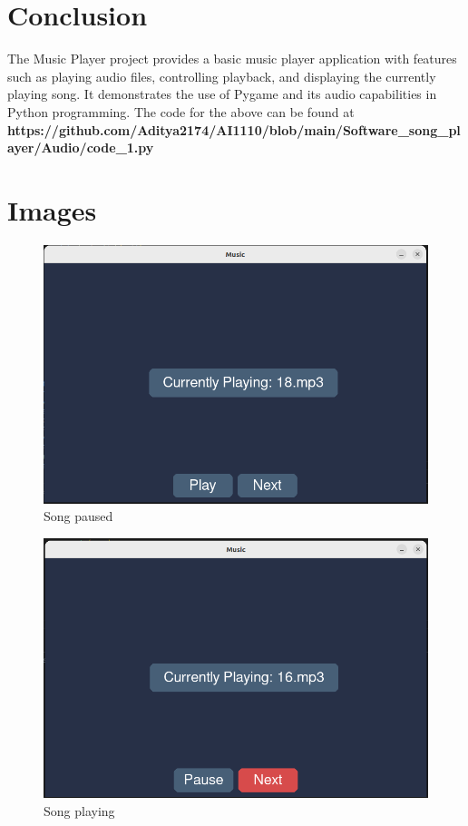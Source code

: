 \documentclass[journal,12pt,twocolumn]{IEEEtran}
\begin{document}
\section{Conclusion}
The Music Player project provides a basic music player application with features such as playing audio files, controlling playback, and displaying the currently playing song. It demonstrates the use of Pygame and its audio capabilities in Python programming.
The code for the above can be found at \textbf{https://github.com/Aditya2174/AI1110/blob/main/Software_song_player/Audio/code_1.py}


\section{Images}
    \begin{figure}[h]
        \includegraphics[width=\columnwidth]{figs/img1.png}
        \caption{Song paused}
        \label{output1}
    \end{figure}

    \begin{figure}[h]
        \includegraphics[width=\columnwidth]{figs/img2.png}
        \caption{Song playing}
        \label{output2}
    \end{figure}
\end{document}
